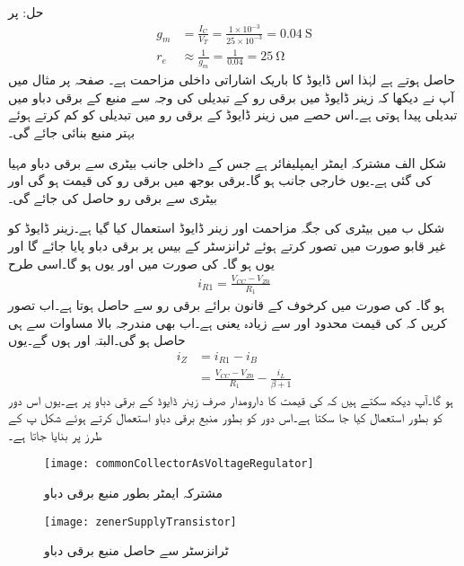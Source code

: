حل: پر 
\begin{align*}
g_m &=\frac{I_C}{V_T}=\frac{1 \times 10^{-3}}{25 \times 10^{-3}}=\SI{0.04}{\siemens}\\
r_e& \approx \frac{1}{g_m}=\frac{1}{0.04}=\SI{25}{\ohm}
\end{align*}
حاصل ہوتے ہے لہٰذا اس ڈایوڈ کا باریک اشاراتی داخلی مزاحمت  ہے۔
صفحہ  پر مثال  میں آپ نے دیکھا کہ زینر ڈایوڈ میں برقی رو کے تبدیلی کی وجہ سے منبع کے برقی دباو میں تبدیلی پیدا ہوتی ہے۔اس حصے میں زینر ڈایوڈ کے برقی رو میں تبدیلی کو کم کرتے ہوئے بہتر منبع بنائی جائے گی۔

شکل  الف مشترکہ ایمٹر ایمپلیفائر ہے جس کے داخلی جانب بیٹری سے  برقی دباو مہیا کی گئی ہے۔یوں  خارجی جانب  ہو گا۔برقی بوجھ  میں برقی رو  کی قیمت  ہو گی اور بیٹری سے  برقی رو حاصل کی جائے گی۔

شکل  ب میں بیٹری کی جگہ مزاحمت  اور زینر ڈایوڈ استعمال کیا گیا ہے۔زینر ڈایوڈ کو غیر قابو صورت میں تصور کرتے ہوئے ٹرانزسٹر کے بیس پر  برقی دباو پایا جائے گا اور یوں  ہو گا۔ کی صورت میں  اور یوں  ہو گا۔اسی طرح
\begin{align}
i_{R1}=\frac{V_{CC}-V_{Z0}}{R_1}
\end{align}
ہو گا۔ کی صورت میں کرخوف کے قانون برائے برقی رو  سے   حاصل ہوتا ہے۔اب تصور کریں کہ  کی قیمت محدود اور  سے زیادہ یعنی  ہے۔اب بھی  مندرجہ بالا مساوات سے ہی حاصل ہو گی۔البتہ  اور  ہوں گے۔یوں 
\begin{align*}
i_Z&=i_{R1}-i_B\\
&=\frac{V_{CC}-V_{Z0}}{R_1}-\frac{i_L}{\beta+1}
\end{align*}
ہو گا۔آپ دیکھ سکتے ہیں کہ  کی قیمت کا دارومدار صرف زینر ڈایوڈ کے برقی دباو پر ہے۔یوں اس دور کو بطور  استعمال کیا جا سکتا ہے۔اس دور کو بطور منبع برقی دباو استعمال کرتے ہوئے شکل  پ کے طرز پر بنایا جاتا ہے۔
%
\begin{figure}
\centering
\texttt{[image: commonCollectorAsVoltageRegulator]}
\caption{مشترکہ ایمٹر بطور منبع برقی دباو}
\label{شکل_ٹرانزسٹر_مشترکہ_مخارج_بطور_منبع}
\end{figure}
%
\begin{figure}
\centering
\texttt{[image: zenerSupplyTransistor]}
\caption{ٹرانزسٹر سے حاصل منبع برقی دباو}
\label{شکل_دو_جوڑ_ٹرانزسٹر_منبع_الف}
\end{figure}

